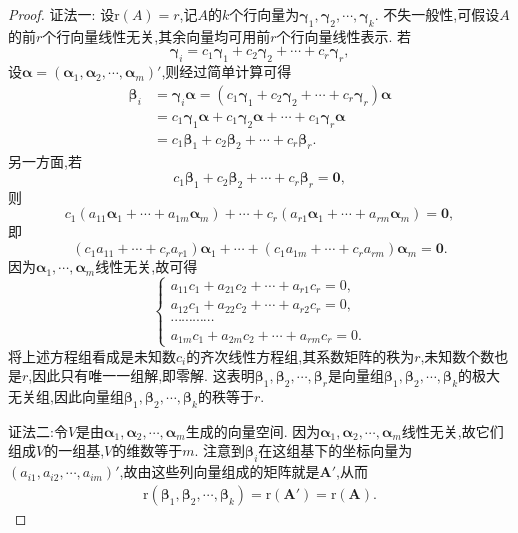 \documentclass[../../main.tex]{subfiles}%
\begin{document}
\begin{proof}

{\color{blue}证法一:}
设\(\text{r}(A)=r\),记\(A\)的\(k\)个行向量为\(\boldsymbol{\gamma}_1,\boldsymbol{\gamma}_2,\cdots,\boldsymbol{\gamma}_k\). 不失一般性,可假设\(A\)的前\(r\)个行向量线性无关,其余向量均可用前\(r\)个行向量线性表示. 若
\[
\boldsymbol{\gamma}_i = c_1\boldsymbol{\gamma}_1 + c_2\boldsymbol{\gamma}_2+\cdots + c_r\boldsymbol{\gamma}_r,
\]
设$\boldsymbol{\alpha }=\left( \boldsymbol{\alpha }_1,\boldsymbol{\alpha }_2,\cdots ,\boldsymbol{\alpha }_m \right)'$,则经过简单计算可得
\begin{align*}
\boldsymbol{\beta }_i&=\boldsymbol{\gamma }_i\boldsymbol{\alpha }=\left( c_1\boldsymbol{\gamma }_1+c_2\boldsymbol{\gamma }_2+\cdots +c_r\boldsymbol{\gamma }_r \right) \boldsymbol{\alpha }
\\
&=c_1\boldsymbol{\gamma }_1\boldsymbol{\alpha }+c_1\boldsymbol{\gamma }_2\boldsymbol{\alpha }+\cdots +c_1\boldsymbol{\gamma }_r\boldsymbol{\alpha }
\\
&=c_1\boldsymbol{\beta }_1+c_2\boldsymbol{\beta }_2+\cdots +c_r\boldsymbol{\beta }_r. 
\end{align*}
另一方面,若
\[
c_1\boldsymbol{\beta}_1 + c_2\boldsymbol{\beta}_2+\cdots + c_r\boldsymbol{\beta}_r=\boldsymbol{0},
\]
则
\[
c_1(a_{11}\boldsymbol{\alpha}_1+\cdots + a_{1m}\boldsymbol{\alpha}_m)+\cdots + c_r(a_{r1}\boldsymbol{\alpha}_1+\cdots + a_{rm}\boldsymbol{\alpha}_m)=\boldsymbol{0},
\]
即
\[
(c_1a_{11}+\cdots + c_ra_{r1})\boldsymbol{\alpha}_1+\cdots + (c_1a_{1m}+\cdots + c_ra_{rm})\boldsymbol{\alpha}_m=\boldsymbol{0}.
\]
因为\(\boldsymbol{\alpha}_1,\cdots,\boldsymbol{\alpha}_m\)线性无关,故可得
\[
\begin{cases}
a_{11}c_1 + a_{21}c_2+\cdots + a_{r1}c_r = 0,\\
a_{12}c_1 + a_{22}c_2+\cdots + a_{r2}c_r = 0,\\
\cdots\cdots\cdots\cdots\\
a_{1m}c_1 + a_{2m}c_2+\cdots + a_{rm}c_r = 0.
\end{cases}
\]
将上述方程组看成是未知数\(c_i\)的齐次线性方程组,其系数矩阵的秩为\(r\),未知数个数也是\(r\),因此只有唯一一组解,即零解. 这表明\(\boldsymbol{\beta}_1,\boldsymbol{\beta}_2,\cdots,\boldsymbol{\beta}_r\)是向量组\(\boldsymbol{\beta}_1,\boldsymbol{\beta}_2,\cdots,\boldsymbol{\beta}_k\)的极大无关组,因此向量组\(\boldsymbol{\beta}_1,\boldsymbol{\beta}_2,\cdots,\boldsymbol{\beta}_k\)的秩等于\(r\).

{\color{blue}证法二:}令\(V\)是由\(\boldsymbol{\alpha}_1,\boldsymbol{\alpha}_2,\cdots,\boldsymbol{\alpha}_m\)生成的向量空间. 因为\(\boldsymbol{\alpha}_1,\boldsymbol{\alpha}_2,\cdots,\boldsymbol{\alpha}_m\)线性无关,故它们组成\(V\)的一组基,\(V\)的维数等于\(m\). 注意到\(\boldsymbol{\beta}_i\)在这组基下的坐标向量为\((a_{i1},a_{i2},\cdots,a_{im})'\),故由这些列向量组成的矩阵就是\(\boldsymbol{A}'\),从而
\begin{align*}
\mathrm{r}\left( \boldsymbol{\beta }_1,\boldsymbol{\beta }_2,\cdots ,\boldsymbol{\beta }_k \right) =\mathrm{r}\left( \boldsymbol{A}' \right) =\mathrm{r}\left( \boldsymbol{A} \right) .
\end{align*}

\end{proof}
\end{document}
